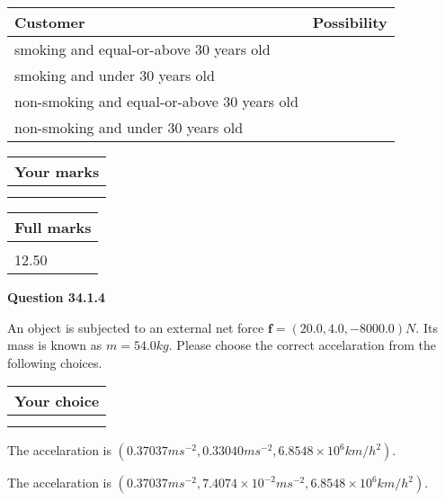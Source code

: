 \documentclass[12pt]{article}
\begin{document}
\noindent
\begin{tabular}{|l|l|}
\hline
Customer & Possibility \\
\hline
smoking  and   %
equal-or-above 30 years old  & \\
\hline
smoking  and   %
under 30 years old & \\
\hline
 non-smoking and   %
equal-or-above 30 years old  & \\
\hline
 non-smoking and  %
under 30 years old & \\
\hline
\end{tabular}
 
 
 

 

 
\vspace{0.3in}
  
\vspace{0.2in}
  
         \begin{tabular}{|l|}
\hline
 Your marks  \\
\hline
 \\ 
 \\ 
\hline
\end{tabular}
\hspace{0.05in} \begin{tabular}{|l|}
\hline
 Full marks  \\
\hline
 \\ 
12.50 \\
\hline
\end{tabular}
{\textbf{\Large{Question
34.1.4 
}}}
  
  
 
An object is subjected to an external net force $\mathbf{f}=(
20.0 ,
4.0,
-8000.0  )N$. Its mass is known as
$m= %
54.0  kg$. Please choose the correct accelaration
from the following choices.
 
  
  
\noindent\hspace{3.0in} \begin{tabular}{|l|}
\hline
Your choice \\
\hline
 \\ 
 \\ 
\hline
\end{tabular}
  
  
 
 
The accelaration is
$(
0.37037ms^{-2},
0.33040ms^{-2},
6.8548 \times 10^{6}km/h^2
).
$
 
 
The accelaration is
$(
0.37037ms^{-2},
7.4074 \times 10^{-2}ms^{-2},
6.8548 \times 10^{6}km/h^2
).
$
 
\end{document}
